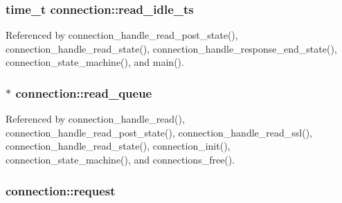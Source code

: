 \hypertarget{structconnection_a3de703d57f7d66da8493cf8554ed3cb2}{
\subsubsection[{read\-\_\-idle\-\_\-ts}]{\setlength{\rightskip}{0pt plus 5cm}time\-\_\-t connection\-::read\-\_\-idle\-\_\-ts}}\label{structconnection_a3de703d57f7d66da8493cf8554ed3cb2}


Referenced by connection\-\_\-handle\-\_\-read\-\_\-post\-\_\-state(), connection\-\_\-handle\-\_\-read\-\_\-state(), connection\-\_\-handle\-\_\-response\-\_\-end\-\_\-state(), connection\-\_\-state\-\_\-machine(), and main().

\hypertarget{structconnection_a1d21a149b6145872f687bbe27b1d90d6}{
\subsubsection[{read\-\_\-queue}]{$\ast$ connection\-::read\-\_\-queue}}\label{structconnection_a1d21a149b6145872f687bbe27b1d90d6}


Referenced by connection\-\_\-handle\-\_\-read(), connection\-\_\-handle\-\_\-read\-\_\-post\-\_\-state(), connection\-\_\-handle\-\_\-read\-\_\-ssl(), connection\-\_\-handle\-\_\-read\-\_\-state(), connection\-\_\-init(), connection\-\_\-state\-\_\-machine(), and connections\-\_\-free().

\hypertarget{structconnection_a4b3fe80fe7d59788f44466d04077b11a}{
\subsubsection[{request}]{ connection\-::request}}\label{structconnection_a4b3fe80fe7d59788f44466d04077b11a}


